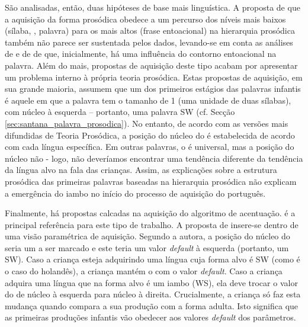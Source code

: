 \documentclass[output=paper]{LSP/langsci}
\begin{document}
São analisadas, então, duas hipóteses de base mais linguística. A proposta de que a aquisição da forma prosódica obedece a um percurso dos níveis mais baixos (sílaba, , palavra) para os mais altos (frase entoacional) na hierarquia prosódica também não parece ser sustentada pelos dados, levando-se em conta as análises de \citet{santos2001} e de \citet{frotavigario2008} de que, inicialmente, há uma influência do contorno entoacional na palavra. Além do mais, propostas de aquisição deste tipo acabam por apresentar um problema interno à própria teoria prosódica. Estas propostas de aquisição, em sua grande maioria, assumem que um dos primeiros estágios das palavras infantis é aquele em que a palavra tem o tamanho de 1  (uma unidade de duas sílabas), com núcleo à esquerda – portanto, uma palavra SW (cf. Secção \ref{sec:santana_palavra_prosodica}). No entanto, de acordo com as versões mais difundidas de Teoria Prosódica, a posição do núcleo do  é estabelecida de acordo com cada língua específica. Em outras palavras, o  é universal, mas a posição do núcleo não -  logo, não deveríamos encontrar uma tendência diferente da tendência da língua alvo na fala das crianças. Assim, as explicações sobre a estrutura prosódica das primeiras palavras baseadas na hierarquia prosódica não explicam a emergência do iambo no início do processo de aquisição do português.

Finalmente, há propostas calcadas na aquisição do algoritmo de acentuação. \citet{fikkert1994} é a principal referência para este tipo de trabalho. A proposta de \citeauthor{fikkert1994} insere-se dentro de uma visão paramétrica de aquisição. Segundo a autora, a posição do núcleo do  seria um  a ser marcado e este  teria um valor \textit{default} à esquerda (portanto, um SW). Caso a criança esteja adquirindo uma língua cuja forma alvo é SW (como é o caso do holandês), a criança mantém o  com o valor \textit{default}. Caso a criança adquira uma língua que na forma alvo é um iambo (WS), ela deve trocar o valor do  de núcleo à esquerda para núcleo à direita. Crucialmente, a criança só faz esta mudança quando compara a sua produção com a forma adulta. Isto significa que as primeiras produções infantis vão obedecer aos valores \textit{default} dos parâmetros.
\end{document}
